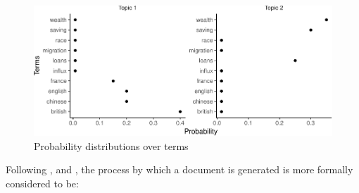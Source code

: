 \documentclass[12pt,]{article}
\theoremstyle{definition}
\theoremstyle{definition}
\theoremstyle{definition}
\theoremstyle{remark}
\begin{document}
\begin{figure}
\centering
\includegraphics{svm-rmarkdown-article-example_files/figure-latex/topicsoverterms-1.pdf}
\caption{\label{fig:topicsoverterms}Probability distributions over terms}
\end{figure}

Following \citet{BleiLafferty2009}, \citet{blei2012} and
\citet{GriffithsSteyvers2004}, the process by which a document is
generated is more formally considered to be:
\end{document}
